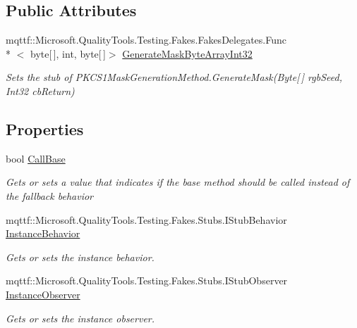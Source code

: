 \subsection*{Public Attributes}
\begin{DoxyCompactItemize}
\item 
mqttf\-::\-Microsoft.\-Quality\-Tools.\-Testing.\-Fakes.\-Fakes\-Delegates.\-Func\\*
$<$ byte\mbox{[}$\,$\mbox{]}, int, byte\mbox{[}$\,$\mbox{]}$>$ \hyperlink{class_system_1_1_security_1_1_cryptography_1_1_fakes_1_1_stub_p_k_c_s1_mask_generation_method_ac5a44631ec23f6a6b47472406ef28ac3}{Generate\-Mask\-Byte\-Array\-Int32}
\begin{DoxyCompactList}\small\item\em Sets the stub of P\-K\-C\-S1\-Mask\-Generation\-Method.\-Generate\-Mask(\-Byte\mbox{[}$\,$\mbox{]} rgb\-Seed, Int32 cb\-Return)\end{DoxyCompactList}\end{DoxyCompactItemize}
\subsection*{Properties}
\begin{DoxyCompactItemize}
\item 
bool \hyperlink{class_system_1_1_security_1_1_cryptography_1_1_fakes_1_1_stub_p_k_c_s1_mask_generation_method_a2cd6172d858c49f1a5309049ef37b03b}{Call\-Base}
\begin{DoxyCompactList}\small\item\em Gets or sets a value that indicates if the base method should be called instead of the fallback behavior\end{DoxyCompactList}\item 
mqttf\-::\-Microsoft.\-Quality\-Tools.\-Testing.\-Fakes.\-Stubs.\-I\-Stub\-Behavior \hyperlink{class_system_1_1_security_1_1_cryptography_1_1_fakes_1_1_stub_p_k_c_s1_mask_generation_method_a343753dec76e0eeb483b26f838267e2d}{Instance\-Behavior}
\begin{DoxyCompactList}\small\item\em Gets or sets the instance behavior.\end{DoxyCompactList}\item 
mqttf\-::\-Microsoft.\-Quality\-Tools.\-Testing.\-Fakes.\-Stubs.\-I\-Stub\-Observer \hyperlink{class_system_1_1_security_1_1_cryptography_1_1_fakes_1_1_stub_p_k_c_s1_mask_generation_method_afda702e88de56ee8ff6bc47fcdbdc054}{Instance\-Observer}
\begin{DoxyCompactList}\small\item\em Gets or sets the instance observer.\end{DoxyCompactList}\end{DoxyCompactItemize}


